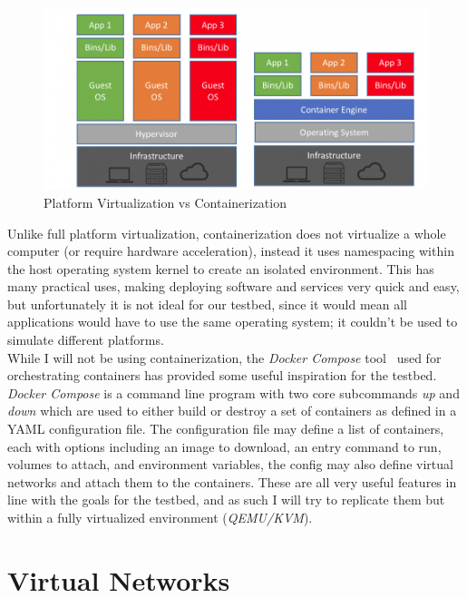 \documentclass[
    author={Jacob Daniel Halsey},
    supervisor={Prof. Awais Rashid},
    degree={BSc},
    title={Building a Testbed for Evaluating Privacy Enhancing Technologies  (PETs)},
    subtitle={},
    type={software development},
    year={2021}
]{dissertation}
\begin{document}
\begin{figure}
	\centering
	\includegraphics[width=12cm]{img/containers}
	\caption[]{Platform Virtualization vs Containerization\footnotemark}
	\label{containers_diagram}
\end{figure}

Unlike full platform virtualization, containerization does not virtualize a whole computer 
(or require hardware acceleration), instead it uses namespacing within the host operating 
system kernel to create an isolated environment. This has many practical uses, making deploying
software and services very quick and easy, but unfortunately it is not ideal for our testbed, since
it would mean all applications would have to use the same operating system; it couldn't be 
used to simulate different platforms. \\

While I will not be using containerization, the \emph{Docker Compose} tool~\cite{docker_compose}
used for orchestrating containers has provided some useful inspiration for the testbed.
\emph{Docker Compose} is a command line program with two core subcommands \emph{up}
and \emph{down} which are used to either build or destroy a set of containers as defined
in a YAML configuration file. The configuration file may define a list of containers, each 
with options including an image to download, an entry command to run, volumes to attach,
and environment variables, the config may also define virtual networks and attach them
to the containers. These are all very useful features in line with the goals for the testbed, and as such
I will try to replicate them but within a fully virtualized environment (\emph{QEMU/KVM}).

\section{Virtual Networks}
\end{document}
